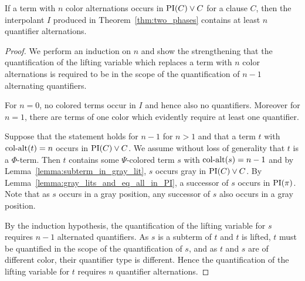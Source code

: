 \begin{lemma}
	\label{lemma:quant_alt_lower_bound}
	If a term with $n$ color alternations occurs in $\operatorname{PI}(C) \lor C$ for a clause $C$, then the interpolant $I$ produced in Theorem~\ref{thm:two_phases} contains at least $n$ quantifier alternations.
\end{lemma}
\begin{proof}
	We perform an induction on $n$
	and show the strengthening that
	the quantification of the lifting variable which replaces a term with $n$ color alternations is required to be in the scope of the quantification of $n-1$ alternating quantifiers.

	For $n=0$, no colored terms occur in $I$ and hence also no quantifiers.
	Moreover for $n=1$, there are terms of one color which evidently require at least one quantifier.

	Suppose that the statement holds for $n-1$ for $n>1$ and that a term $t$ with $\operatorname{col-alt}(t) = n$ occurs in $\operatorname{PI}(C) \lor C$.
	We assume without loss of generality that $t$ is a $\Phi$-term.
	Then $t$ contains some $\Psi$-colored term $s$ with $\operatorname{col-alt}(s) = n-1$ and
	by Lemma~\ref{lemma:subterm_in_gray_lit}, $s$ occurs gray in $\operatorname{PI}(C) \lor C$.
	By Lemma~\ref{lemma:gray_lits_and_eq_all_in_PI}, a successor of $s$ occurs in $\operatorname{PI}(\pi)$. Note that as $s$ occurs in a gray position, any successor of $s$ also occurs in a gray position.

	By the induction hypothesis, the quantification of the lifting variable for $s$ requires $n-1$ alternated quantifiers.
	As $s$ is a subterm of $t$ and $t$ is lifted, $t$ must be quantified in the scope of the quantification of $s$, and as $t$ and $s$ are of different color, their quantifier type is different. 
	Hence the quantification of the lifting variable for $t$ requires $n$ quantifier alternations.
\end{proof}

\begin{comment}
\begin{lemma}
	\label{lemma:quant_alt_lower_bound_old}
	If a term with $n$ color alternations occurs in $\PI^*(C) \lor C$ for a clause $C$, then the interpolant $I$ produced in Theorem~\ref{thm:two_phases} contains at least $n-1$ quantifier alternations.
\end{lemma}
\begin{proof}
	By Lemma~\ref{lemma:subterm_in_gray_lit}, a term with $n-1$ color alternations occurs in a gray literal or an equality in $\PI(C) \lor C$.
	Lemma~\ref{lemma:col_alt_in_gray_lit_then_quant_alt} gives the result.
\end{proof}
\end{comment}

